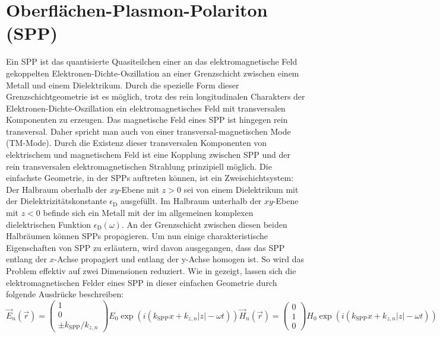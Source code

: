 \documentclass[a4paper, titlepage,  ngerman, fullpage]{book}
\begin{document}
	\section{Oberflächen-Plasmon-Polariton (SPP)}
	\label{sec:spp}		
	Ein SPP ist das quantisierte Quasiteilchen einer an das elektromagnetische Feld gekoppelten Elektronen-Dichte-Oszillation an einer Grenzschicht zwischen einem Metall und einem Dielektrikum. Durch die spezielle Form dieser Grenzschichtgeometrie ist es möglich, trotz des rein longitudinalen Charakters der Elektronen-Dichte-Oszillation ein elektromagnetisches Feld mit transversalen Komponenten zu erzeugen. Das magnetische Feld eines SPP ist hingegen rein transversal. Daher spricht man auch von einer transversal-magnetischen Mode (TM-Mode). Durch die Existenz dieser transversalen Komponenten von elektrischem und magnetischem Feld ist eine Kopplung zwischen SPP und der rein transversalen elektromagnetischen Strahlung prinzipiell möglich. Die einfachste Geometrie, in der SPPs auftreten können, ist ein Zweischichtsystem: Der Halbraum oberhalb der $xy$-Ebene mit $z>0$ sei von einem Dielektrikum mit der Dielektrizitätskonstante $\epsilon_\mathrm{D}$ ausgefüllt. Im Halbraum unterhalb der $xy$-Ebene mit $z<0$ befinde sich ein Metall mit der im allgemeinen komplexen dielektrischen Funktion $\epsilon_\mathrm{D}(\omega)$. An der Grenzschicht zwischen diesen beiden Halbräumen können SPPs propagieren. Um nun einige charakteristische Eigenschaften von SPP zu erläutern, wird davon ausgegangen, dass das SPP entlang der $x$-Achse propagiert und entlang der y-Achse homogen ist. So wird das Problem effektiv auf zwei Dimensionen reduziert. Wie in \cite{Maier.2007} gezeigt, lassen sich die elektromagnetischen Felder eines SPP in dieser einfachen Geometrie durch folgende Ausdrücke beschreiben:
	\begin{subequations}
		\label{eq:fields_spp}
		\begin{equation}
			\label{eq:electric_field_spp}
			\vec{E}_n(\vec{r}) = \begin{pmatrix} 1 \\ 0 \\ \pm k_{\mathrm{SPP}}/k_{z,n} \end{pmatrix} E_0 \exp\left(i(k_{\mathrm{SPP}}x + k_{z, n}|z|-\omega t)\right)	
		\end{equation}
		\begin{equation}
			\label{eq:magnetic_field_spp}
			\vec{H}_n(\vec{r}) = \begin{pmatrix} 0 \\ 1 \\ 0 \end{pmatrix} H_0 \exp\left(i(k_{\mathrm{SPP}}x + k_{z, n}|z|-\omega t)\right)
		\end{equation}
	\end{subequations}
\end{document}
